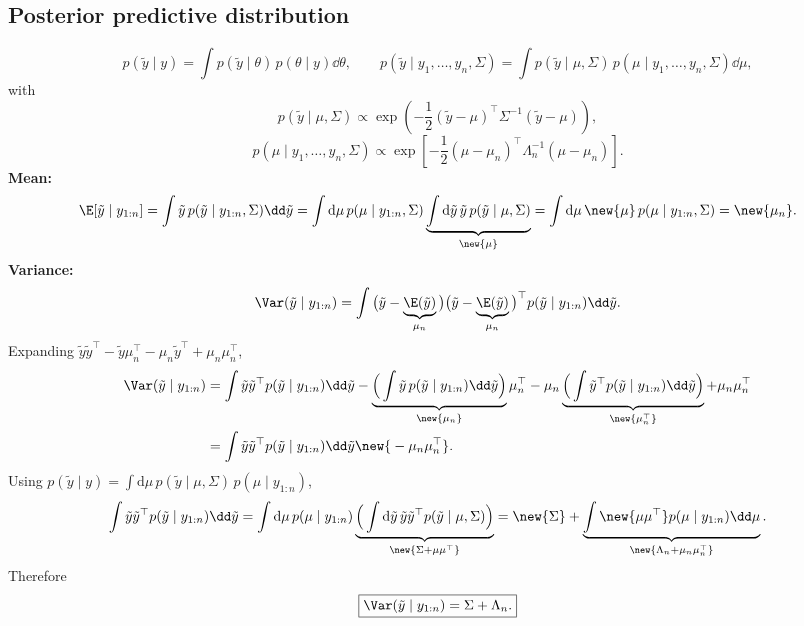 \subsection{Posterior predictive distribution}
\[
p(\tilde y \mid y) = \int p(\tilde y \mid \theta)\,p(\theta \mid y)\dd\theta,
\qquad
p(\tilde{y} \mid y_1, \dots, y_n, \Sigma) = \int p(\tilde{y} \mid \mu, \Sigma)\,p(\mu \mid y_1, \dots, y_n, \Sigma)\dd\mu,
\]
with
\[
p(\tilde{y} \mid \mu, \Sigma) \propto \exp\left(-\frac12(\tilde{y} - \mu)^{\top}\Sigma^{-1}(\tilde{y} - \mu)\right),
\]
\[
p(\mu \mid y_1, \dots, y_n, \Sigma) \propto \exp\left[-\frac12(\mu - \mu_n)^{\top}\Lambda_n^{-1}(\mu - \mu_n)\right].
\]
\textbf{Mean:}
\[
\E[\tilde{y} \mid y_{1:n}] = \int \tilde{y}\,p(\tilde{y} \mid y_{1:n}, \Sigma)\dd\tilde{y}
= \int \mathrm{d}\mu\,p(\mu \mid y_{1:n}, \Sigma)\underbrace{\int \mathrm{d}\tilde{y}\,\tilde{y}\,p(\tilde{y} \mid \mu, \Sigma)}_{\new{\mu}}
= \int \mathrm{d}\mu\,\new{\mu}\,p(\mu \mid y_{1:n}, \Sigma) = \new{\mu_n}.
\]
\textbf{Variance:}
\[
\Var(\tilde{y} \mid y_{1:n}) = \int\big(\tilde{y} - \underbrace{\E(\tilde{y})}_{\mu_n}\big)\big(\tilde{y} - \underbrace{\E(\tilde{y})}_{\mu_n}\big)^{\top}p(\tilde{y} \mid y_{1:n})\dd\tilde{y}.
\]
Expanding $\tilde{y}\tilde{y}^{\top} - \tilde{y}\mu_n^{\top} - \mu_n\tilde{y}^{\top} + \mu_n\mu_n^{\top}$,
\begin{align*}
\Var(\tilde{y} \mid y_{1:n}) &= \int \tilde{y}\tilde{y}^{\top}p(\tilde{y} \mid y_{1:n})\dd\tilde{y} - \underbrace{\Big(\int \tilde{y}\,p(\tilde{y} \mid y_{1:n})\dd\tilde{y}\Big)}_{\new{\mu_n}}\mu_n^{\top} - \mu_n\underbrace{\Big(\int \tilde{y}^{\top}p(\tilde{y} \mid y_{1:n})\dd\tilde{y}\Big)}_{\new{\mu_n^{\top}}} + \mu_n\mu_n^{\top}\\
&= \int \tilde{y}\tilde{y}^{\top}p(\tilde{y} \mid y_{1:n})\dd\tilde{y} \new{{}- \mu_n\mu_n^{\top}}.
\end{align*}
Using $p(\tilde y \mid y) = \int \mathrm{d}\mu\,p(\tilde{y} \mid \mu, \Sigma)\,p(\mu \mid y_{1:n})$,
\[
\int \tilde{y}\tilde{y}^{\top}p(\tilde{y} \mid y_{1:n})\dd\tilde{y}
= \int \mathrm{d}\mu\,p(\mu \mid y_{1:n})\underbrace{\Big(\int \mathrm{d}\tilde{y}\,\tilde{y}\tilde{y}^{\top}p(\tilde{y} \mid \mu, \Sigma)\Big)}_{\new{\Sigma + \mu\mu^{\top}}}
= \new{\Sigma} + \underbrace{\int \new{\mu\mu^{\top}}p(\mu \mid y_{1:n})\dd\mu}_{\new{\Lambda_n + \mu_n\mu_n^{\top}}}.
\]
Therefore
\[
\boxed{\Var(\tilde{y} \mid y_{1:n}) = \Sigma + \Lambda_n.}
\]

